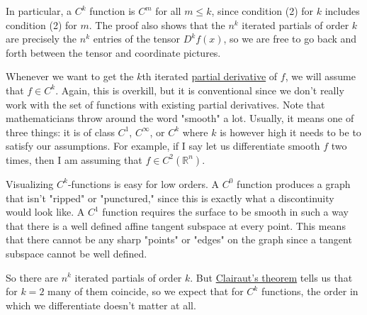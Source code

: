   In particular, a $C^k$ function is $C^m$ for all $m \leq k$, since condition (2) for $k$ includes condition (2) for $m$. The proof also shows that the $n^k$ iterated partials of order $k$ are precisely the $n^k$ entries of the tensor $D^k f(x)$, so we are free to go back and forth between the tensor and coordinate pictures. 

  Whenever we want to get the $k$th iterated \hyperref[def:partial-derivative]{partial derivative} of $f$, we will assume that $f \in C^k$. Again, this is overkill, but it is conventional since we don't really work with the set of functions with existing partial derivatives. Note that mathematicians throw around the word "smooth" a lot. Usually, it means one of three things: it is of class $C^1$, $C^\infty$, or $C^k$ where $k$ is however high it needs to be to satisfy our assumptions. For example, if I say let us differentiate smooth $f$ two times, then I am assuming that $f \in C^2 (\mathbb{R}^n)$. 

  Visualizing $C^k$-functions is easy for low orders. A $C^0$ function produces a graph that isn't "ripped" or "punctured," since this is exactly what a discontinuity would look like. A $C^1$ function requires the surface to be smooth in such a way that there is a well defined affine tangent subspace at every point. This means that there cannot be any sharp "points" or "edges" on the graph since a tangent subspace cannot be well defined. 

  So there are $n^k$ iterated partials of order $k$. But \hyperref[thm:clairuts-theorem]{Clairaut's theorem} tells us that for $k = 2$ many of them coincide, so we expect that for $C^k$ functions, the order in which we differentiate doesn't matter at all.

